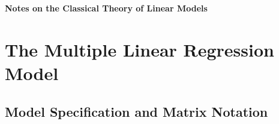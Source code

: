 \documentclass[12pt,a4paper]{article}
\theoremstyle{definition}
\begin{document}
\begingroup
\centering
{\LARGE\bfseries Notes on the Classical Theory of Linear Models\par}
\vspace{4pt}
\endgroup


\section{The Multiple Linear Regression Model}

\subsection{Model Specification and Matrix Notation}
\end{document}
